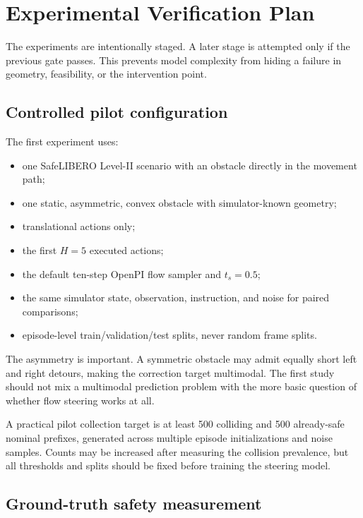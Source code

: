 \documentclass[10pt,conference]{IEEEtran}
\newcommand{\1}{\mathbf{1}}
\begin{document}
\section{Experimental Verification Plan}

The experiments are intentionally staged. A later stage is attempted only if the previous gate passes. This prevents model complexity from hiding a failure in geometry, feasibility, or the intervention point.

\subsection{Controlled pilot configuration}

The first experiment uses:
\begin{itemize}[leftmargin=*,nosep]
    \item one SafeLIBERO Level-II scenario with an obstacle directly in the movement path;
    \item one static, asymmetric, convex obstacle with simulator-known geometry;
    \item translational actions only;
    \item the first $H=5$ executed actions;
    \item the default ten-step OpenPI flow sampler and $t_s=0.5$;
    \item the same simulator state, observation, instruction, and noise for paired comparisons;
    \item episode-level train/validation/test splits, never random frame splits.
\end{itemize}

The asymmetry is important. A symmetric obstacle may admit equally short left and right detours, making the correction target multimodal. The first study should not mix a multimodal prediction problem with the more basic question of whether flow steering works at all.

A practical pilot collection target is at least 500 colliding and 500 already-safe nominal prefixes, generated across multiple episode initializations and noise samples. Counts may be increased after measuring the collision prevalence, but all thresholds and splits should be fixed before training the steering model.

\subsection{Ground-truth safety measurement}
\end{document}
